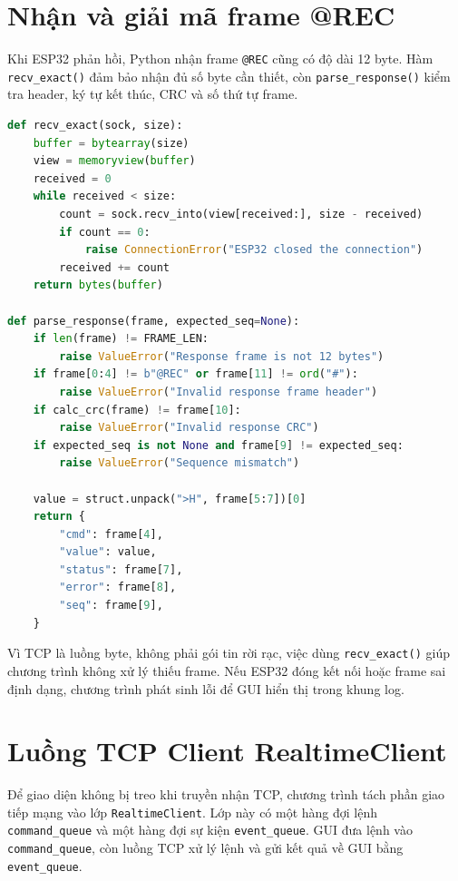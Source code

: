 \documentclass[12pt,a4paper]{report}
\begin{document}
\section{Nhận và giải mã frame @REC}

Khi ESP32 phản hồi, Python nhận frame \texttt{@REC} cũng có độ dài 12 byte. Hàm \texttt{recv\_exact()} đảm bảo nhận đủ số byte cần thiết, còn \texttt{parse\_response()} kiểm tra header, ký tự kết thúc, CRC và số thứ tự frame.

\begin{lstlisting}[language=Python]
def recv_exact(sock, size):
    buffer = bytearray(size)
    view = memoryview(buffer)
    received = 0
    while received < size:
        count = sock.recv_into(view[received:], size - received)
        if count == 0:
            raise ConnectionError("ESP32 closed the connection")
        received += count
    return bytes(buffer)

def parse_response(frame, expected_seq=None):
    if len(frame) != FRAME_LEN:
        raise ValueError("Response frame is not 12 bytes")
    if frame[0:4] != b"@REC" or frame[11] != ord("#"):
        raise ValueError("Invalid response frame header")
    if calc_crc(frame) != frame[10]:
        raise ValueError("Invalid response CRC")
    if expected_seq is not None and frame[9] != expected_seq:
        raise ValueError("Sequence mismatch")

    value = struct.unpack(">H", frame[5:7])[0]
    return {
        "cmd": frame[4],
        "value": value,
        "status": frame[7],
        "error": frame[8],
        "seq": frame[9],
    }
\end{lstlisting}

Vì TCP là luồng byte, không phải gói tin rời rạc, việc dùng \texttt{recv\_exact()} giúp chương trình không xử lý thiếu frame. Nếu ESP32 đóng kết nối hoặc frame sai định dạng, chương trình phát sinh lỗi để GUI hiển thị trong khung log.

\section{Luồng TCP Client RealtimeClient}

Để giao diện không bị treo khi truyền nhận TCP, chương trình tách phần giao tiếp mạng vào lớp \texttt{RealtimeClient}. Lớp này có một hàng đợi lệnh \texttt{command\_queue} và một hàng đợi sự kiện \texttt{event\_queue}. GUI đưa lệnh vào \texttt{command\_queue}, còn luồng TCP xử lý lệnh và gửi kết quả về GUI bằng \texttt{event\_queue}.
\end{document}
